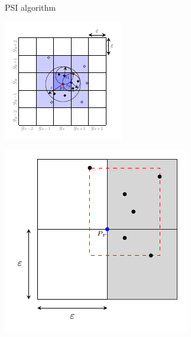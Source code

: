 \documentclass{beamer}
\begin{document}
    \begin{frame}{PSI algorithm}
        \begin{minipage}{0.5\textwidth}
            \includegraphics[width=\textwidth]{../thesis/chapter4/figures/grid_prime}
        \end{minipage}\hfill %
        \begin{minipage}{0.5\textwidth}
            \includegraphics[width=\textwidth]{../thesis/chapter4/figures/square}
        \end{minipage}
    \end{frame}
\end{document}
